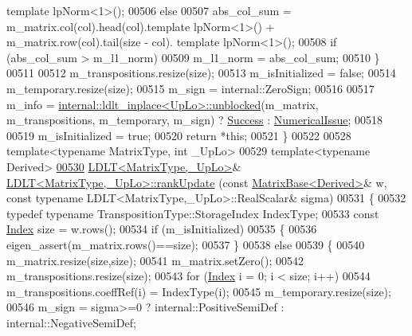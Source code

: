 \begin{DoxyCode}
      template lpNorm<1>();
00506     \textcolor{keywordflow}{else}
00507       abs\_col\_sum = m\_matrix.col(col).head(col).template lpNorm<1>() + m\_matrix.row(col).tail(size - col).
      template lpNorm<1>();
00508     \textcolor{keywordflow}{if} (abs\_col\_sum > m\_l1\_norm)
00509       m\_l1\_norm = abs\_col\_sum;
00510   \}
00511 
00512   m\_transpositions.resize(size);
00513   m\_isInitialized = \textcolor{keyword}{false};
00514   m\_temporary.resize(size);
00515   m\_sign = internal::ZeroSign;
00516 
00517   m\_info = \hyperlink{struct_eigen_1_1internal_1_1ldlt__inplace}{internal::ldlt\_inplace<UpLo>::unblocked}(m\_matrix, 
      m\_transpositions, m\_temporary, m\_sign) ? \hyperlink{group__enums_gga85fad7b87587764e5cf6b513a9e0ee5ea52581b035f4b59c203b8ff999ef5fcea}{Success} : \hyperlink{group__enums_gga85fad7b87587764e5cf6b513a9e0ee5eaaf9b736d310a664e7729d163a035cc5f}{NumericalIssue};
00518 
00519   m\_isInitialized = \textcolor{keyword}{true};
00520   \textcolor{keywordflow}{return} *\textcolor{keyword}{this};
00521 \}
00522 
00528 \textcolor{keyword}{template}<\textcolor{keyword}{typename} MatrixType, \textcolor{keywordtype}{int} \_UpLo>
00529 \textcolor{keyword}{template}<\textcolor{keyword}{typename} Derived>
\hyperlink{group___cholesky___module_a59a415ea2ba2d6208233da42f981579a}{00530} \hyperlink{group___cholesky___module_class_eigen_1_1_l_d_l_t}{LDLT<MatrixType,\_UpLo>}& \hyperlink{group___cholesky___module_class_eigen_1_1_l_d_l_t}{LDLT<MatrixType,\_UpLo>::rankUpdate}
      (\textcolor{keyword}{const} \hyperlink{group___core___module_class_eigen_1_1_matrix_base}{MatrixBase<Derived>}& w, \textcolor{keyword}{const} \textcolor{keyword}{typename} LDLT<MatrixType,\_UpLo>::RealScalar& sigma)
00531 \{
00532   \textcolor{keyword}{typedef} \textcolor{keyword}{typename} TranspositionType::StorageIndex IndexType;
00533   \textcolor{keyword}{const} \hyperlink{group___cholesky___module_ad9c57eb2fb3bbccd51b9d2e111bea355}{Index} size = w.rows();
00534   \textcolor{keywordflow}{if} (m\_isInitialized)
00535   \{
00536     eigen\_assert(m\_matrix.rows()==size);
00537   \}
00538   \textcolor{keywordflow}{else}
00539   \{
00540     m\_matrix.resize(size,size);
00541     m\_matrix.setZero();
00542     m\_transpositions.resize(size);
00543     \textcolor{keywordflow}{for} (\hyperlink{group___cholesky___module_ad9c57eb2fb3bbccd51b9d2e111bea355}{Index} i = 0; i < size; i++)
00544       m\_transpositions.coeffRef(i) = IndexType(i);
00545     m\_temporary.resize(size);
00546     m\_sign = sigma>=0 ? internal::PositiveSemiDef : internal::NegativeSemiDef;

\end{DoxyCode}
